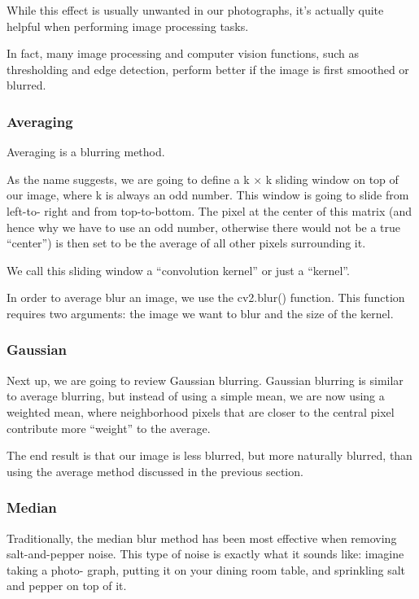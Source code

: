\documentclass[BTech]{srmuthesis}
\begin{document}
While this effect is usually unwanted in our photographs, it’s actually quite helpful when performing image processing tasks.

In fact, many image processing and computer vision functions, such as thresholding and edge detection, perform better if the image is first smoothed or blurred.

\subsubsection{Averaging}

Averaging is a blurring method.

As the name suggests, we are going to define a k × k sliding window on top of our image, where k is always an odd number. This window is going to slide from left-to- right and from top-to-bottom. The pixel at the center of this matrix (and hence why we have to use an odd number, otherwise there would not be a true “center”) is then set to be the average of all other pixels surrounding it.

We call this sliding window a “convolution kernel” or just a “kernel”. 

In order to average blur an image, we use the cv2.blur() function. This function requires two arguments: the image we want to blur and the size of the kernel.

\subsubsection{Gaussian}

Next up, we are going to review Gaussian blurring. Gaussian blurring is similar to average blurring, but instead of using a simple mean, we are now using a weighted mean, where neighborhood pixels that are closer to the central pixel contribute more “weight” to the average.

The end result is that our image is less blurred, but more naturally blurred, than using the average method discussed in the previous section.

\subsubsection{Median}

Traditionally, the median blur method has been most effective when removing salt-and-pepper noise. This type of noise is exactly what it sounds like: imagine taking a photo- graph, putting it on your dining room table, and sprinkling salt and pepper on top of it. 
\end{document}

